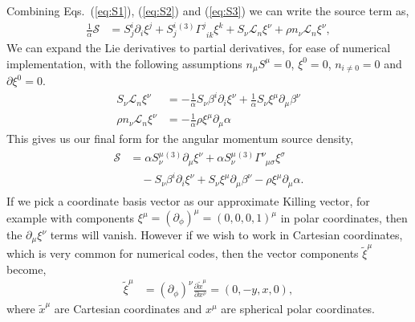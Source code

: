 Combining Eqs.~(\ref{eq:S1}), (\ref{eq:S2}) and (\ref{eq:S3}) we can write the source term as,
\begin{align}
\frac{1}{\alpha}\mathcal{S} &= S^i_{j}\partial_i \xi^j + S^i_{j} {}^{(3)}\Gamma^j_{\,\,\,i k} \xi^k + S_\nu \mathcal{L}_n \xi^\nu + \rho n_\nu \mathcal{L}_n \xi^\nu,
\end{align}
We can expand the Lie derivatives to partial derivatives, for ease of numerical implementation, with the following assumptions $n_\mu S^\mu = 0$, $\xi^0 = 0$, $n_{i\neq0}=0$ and $\partial \xi^0 = 0$.
\begin{align}
S_\nu \mathcal{L}_n \xi^\nu &= -\frac{1}{\alpha} S_\nu \beta^i \partial_i \xi^\nu  + \frac{1}{\alpha}S_\nu \xi^\mu \partial_\mu \beta^\nu \\
\rho n_\nu \mathcal{L}_n \xi^\nu &= -\frac{1}{\alpha} \rho \xi^\mu \partial_\mu \alpha 
\end{align}
This gives us our final form for the angular momentum source density,
\begin{align}\label{s_explicit} 
\begin{split}
\mathcal{S} &= \alpha S^\mu_{\nu}{}^{(3)}\partial_\mu \xi^\nu + \alpha S^\mu_{\nu} {}^{(3)}\Gamma^\nu_{\,\,\,\mu \sigma} \xi^\sigma \\&\quad- S_\nu \beta^i \partial_i \xi^\nu  + S_\nu \xi^\mu \partial_\mu \beta^\nu - \rho \xi^\mu \partial_\mu \alpha.
\end{split}
\end{align}
If we pick a coordinate basis vector as our approximate Killing vector, for example with components $\xi^\mu = (\partial_\phi)^\mu =(0,0,0,1)^\mu$ in polar coordinates, then the $\partial_\mu \xi^\nu$ terms will vanish. However if we wish to work in Cartesian coordinates, which is very common for numerical codes, then the vector components $\tilde\xi^\mu$ become,
\begin{align}
\tilde \xi ^\mu  &= (\partial_\phi)^\nu \frac{\partial \tilde x^\mu}{\partial x^\nu}=  (0,-y,x,0),
\end{align}
where $\tilde x^\mu$ are Cartesian coordinates and $x^\mu$ are spherical polar coordinates.



